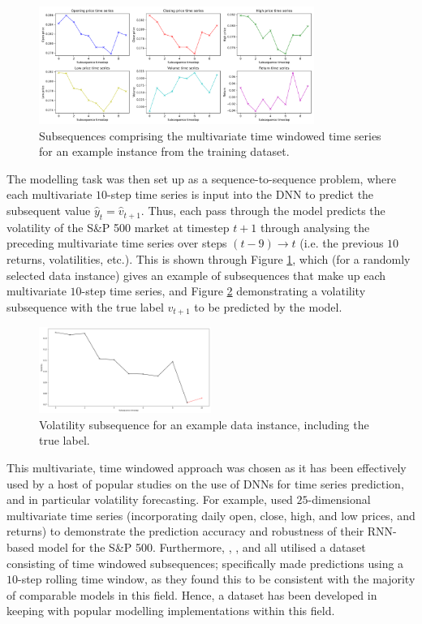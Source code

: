 \documentclass[a4paper, 11pt]{report}
\begin{document}
    \begin{figure}[ht]
        \centering
        \includegraphics[width=0.8\textwidth]{subsequences.png}
        \caption{\centering Subsequences comprising the multivariate time windowed time series for an example instance from the training dataset.}
        \label{fig: subsequences}
    \end{figure}


    The modelling task was then set up as a sequence-to-sequence problem, where each multivariate $10$-step time series is input into the DNN to predict the subsequent value $\hat{y}_t = \hat{v}_{t+1}$. Thus, each pass through the model predicts the volatility of the S\&P 500 market at timestep $t+1$ through analysing the preceding multivariate time series over steps $(t-9) \to t$ (i.e. the previous $10$ returns, volatilities, etc.). This is shown through Figure \ref{fig: subsequences}, which (for a randomly selected data instance) gives an example of subsequences that make up each multivariate $10$-step time series, and Figure \ref{fig: volatility-subsequence} demonstrating a volatility subsequence with the true label $v_{t+1}$ to be predicted by the model.


    \begin{figure}[ht]
        \centering
        \includegraphics[width=0.5\textwidth]{volatility-subsequence.png}
        \caption{\centering Volatility subsequence for an example data instance, including the true label.}
        \label{fig: volatility-subsequence}
    \end{figure}


    This multivariate, time windowed approach was chosen as it has been effectively used by a host of popular studies on the use of DNNs for time series prediction, and in particular volatility forecasting. For example, \citet{xiong-2016} used $25$-dimensional multivariate time series (incorporating daily open, close, high, and low prices, and returns) to demonstrate the prediction accuracy and robustness of their RNN-based model for the S\&P 500. Furthermore, \citet{xiong-2016}, \citet{bucci-2020}, and \citet{rodikov-2022} all utilised a dataset consisting of time windowed subsequences; \citet{xiong-2016} specifically made predictions using a $10$-step rolling time window, as they found this to be consistent with the majority of comparable models in this field. Hence, a dataset has been developed in keeping with popular modelling implementations within this field.
\end{document}
